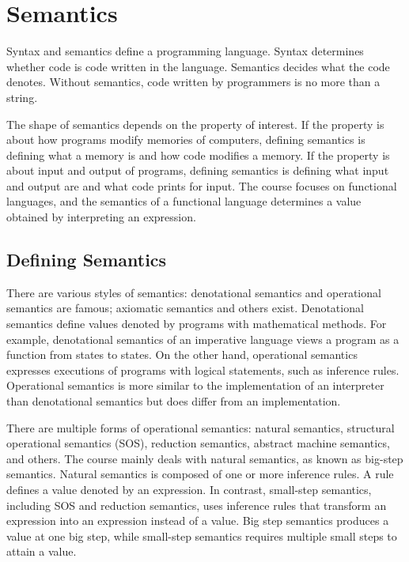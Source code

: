 \setchapterpreamble[u]{\margintoc}
\chapter{Semantics}

Syntax and semantics define a programming language. Syntax determines whether
code is code written in the language. Semantics decides what the code denotes.
Without semantics, code written by programmers is no more than a string.

The shape of semantics depends on the property of interest. If the property is
about how programs modify memories of computers, defining semantics is
defining what a memory is and how code modifies a memory. If the property is
about input and output of programs, defining semantics is defining what input
and output are and what code prints for input. The course focuses on
functional languages, and the semantics of a functional language determines a
value obtained by interpreting an expression.

\section{Defining Semantics}

There are various styles of semantics: denotational semantics and operational
semantics are famous; axiomatic semantics and others exist. Denotational
semantics define values denoted by programs with mathematical methods. For
example, denotational semantics of an imperative language views a program as a
function from states to states. On the other hand, operational semantics
expresses executions of programs with logical statements, such as inference
rules. Operational semantics is more similar to the implementation of an
interpreter than denotational semantics but does differ from an implementation.

There are multiple forms of operational semantics: natural semantics,
structural operational semantics (SOS), reduction semantics, abstract machine
semantics, and others. The course mainly deals with natural semantics, as
known as big-step semantics. Natural semantics is composed of one or more
inference rules. A rule defines a value denoted by an expression. In contrast,
small-step semantics, including SOS and reduction semantics, uses inference
rules that transform an expression into an expression instead of a value. Big
step semantics produces a value at one big step, while small-step semantics
requires multiple small steps to attain a value.


